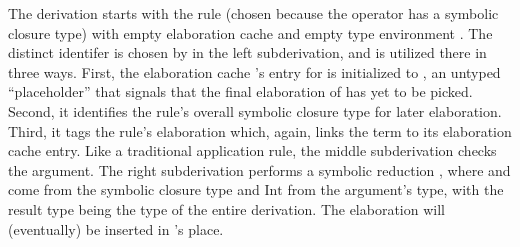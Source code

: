 %
The derivation starts with the \ltiSCAppInfClosure rule (chosen because the operator
\ltiufun{\ltivar{}}{\ltiF{}}
has a symbolic closure type)
with empty elaboration cache \ltiEmptyClosureCache
and empty type environment \ltiEmptyEnv.
The distinct identifer {{\colorbox{pink}{\ltiClosureID{}}}}
is chosen by \ltiSCUAbs in the left subderivation, and is utilized there in three ways.
First, the elaboration cache \ltiClosureCache{}'s entry for
{{\colorbox{pink}{\ltiClosureID{}}}} is initialized
to
{\ltiClosure{\ltiEmptyEnv}{\ltiufun{\ltivar{}}{\ltiF{}}}},
an untyped ``placeholder'' that signals that the final elaboration of {{\colorbox{pink}{\ltiClosureID{}}}}
has yet to be picked.
Second, it identifies the rule's overall symbolic closure type
                      {\ltiClosureWithStkID{\ltiEmptyEnv}
                                           {{\colorbox{pink}{\ltiClosureID{}}}}
                                           {\ltiufun{\ltivar{}}
                                                    {\ltiF{}}}}
for later elaboration.
Third, it tags the rule's elaboration {\colorbox{pink}{\ltiufunelab{\ltiClosureID{}}{\ltivar{}}{\ltiF{}}}}
which, again, links the term to its elaboration cache entry.
Like a traditional application rule, the middle subderivation checks the argument.
The right subderivation performs a symbolic reduction
    \ltitSstkjudgementNoCombined{\ltiClosureCache{}}
                      {\hastype{\ltivar{}}
                               {{}}}
                      {\ltiF{}}
                      {{\colorbox{pink}{\ltiS{}}}}
                      {\ltiClosureCache{}}
                      {{\colorbox{pink}{\ltiFp{}}}},
where \ltivar{} and \ltiF{} come from the symbolic closure type
and $\text{Int}$ from the argument's type,
with the result type \colorbox{pink}{\ltiS{}} being the type of the entire derivation.
The elaboration \colorbox{pink}{\ltiFp{}}
will (eventually) be inserted in \ltiF{}'s place.

